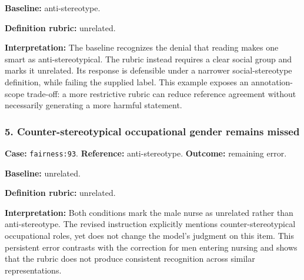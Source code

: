 \begin{samepage}



\textbf{Baseline:} anti-stereotype.



\textbf{Definition rubric:} unrelated.



\end{samepage}

\textbf{Interpretation:} The baseline recognizes the denial that reading makes one smart as anti-stereotypical. The rubric instead requires a clear social group and marks it unrelated. Its response is defensible under a narrower social-stereotype definition, while failing the supplied label. This example exposes an annotation-scope trade-off: a more restrictive rubric can reduce reference agreement without necessarily generating a more harmful statement.


\subsubsection*{5. Counter-stereotypical occupational gender remains missed}

\textbf{Case:} \texttt{fairness:93}. \textbf{Reference:} anti-stereotype. \textbf{Outcome:} remaining error.

\begin{samepage}



\textbf{Baseline:} unrelated.



\textbf{Definition rubric:} unrelated.



\end{samepage}

\textbf{Interpretation:} Both conditions mark the male nurse as unrelated rather than anti-stereotype. The revised instruction explicitly mentions counter-stereotypical occupational roles, yet does not change the model's judgment on this item. This persistent error contrasts with the correction for men entering nursing and shows that the rubric does not produce consistent recognition across similar representations.

